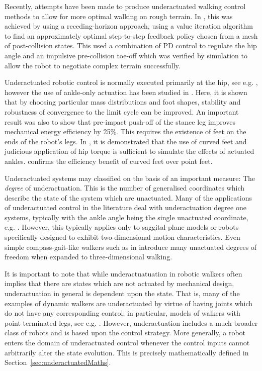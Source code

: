 Recently, attempts have been made to produce underactuated walking control methods to allow for more optimal walking on rough terrain. In \cite{byl2008approximate}, this was achieved by using a receding-horizon approach, using a value iteration algorithm \cite{sutton1998introduction} to find an approximately optimal step-to-step feedback policy chosen from a mesh of post-collision states. This used a combination of PD control to regulate the hip angle and an impulsive pre-collision toe-off which was verified by simulation to allow the robot to negotiate complex terrain successfully.

Underactuated robotic control is normally executed primarily at the hip, see e.g. \cite{tedrake2004actuating, byl2008approximate, manchester2011stable}, however the use of ankle-only actuation has been studied in \cite{franken2008analysis}. Here, it is shown that by choosing particular mass distributions and foot shapes, stability and robustness of convergence to the limit cycle can be improved. An important result was also to show that pre-impact push-off of the stance leg improves mechanical energy efficiency by 25\%. This requires the existence of feet on the ends of the robot's legs. In \cite{asano2007dynamic}, it is demonstrated that the use of curved feet and judicious application of hip torque is sufficient to simulate the effects of actuated ankles. \cite{martin2014design} confirms the efficiency benefit of curved feet over point feet.

Underactuated systems may classified on the basis of an important measure: The \textit{degree} of underactuation. This is the number of generalised coordinates which describe the state of the system which are unactuated. Many of the applications of underactuated control in the literature deal with underactuation degree one systems, typically with the ankle angle being the single unactuated coordinate, e.g. \cite{byl2008approximate, westervelt2003hybrid}. However, this typically applies only to saggital-plane models or robots specifically designed to exhibit two-dimensional motion characteristics. Even simple compass-gait-like walkers such as in \cite{tedrake2004actuating} introduce many unactuated degrees of freedom when expanded to three-dimensional walking.

It is important to note that while underactuatuation in robotic walkers often implies that there are states which are not actuated by mechanical design, underactuation in general is dependent upon the state. That is, many of the examples of dynamic walkers are underactuated by virtue of having joints which do not have any corresponding control; in particular, models of walkers with point-terminated legs, see e.g. \cite{westervelt2003hybrid}. However, underactuation includes a much broader class of robots and is based upon the control strategy. More generally, a robot enters the domain of underactuated control whenever the control inputs cannot arbitrarily alter the state evolution. This is precisely mathematically defined in Section~\ref{sec:underactuatedMaths}.

